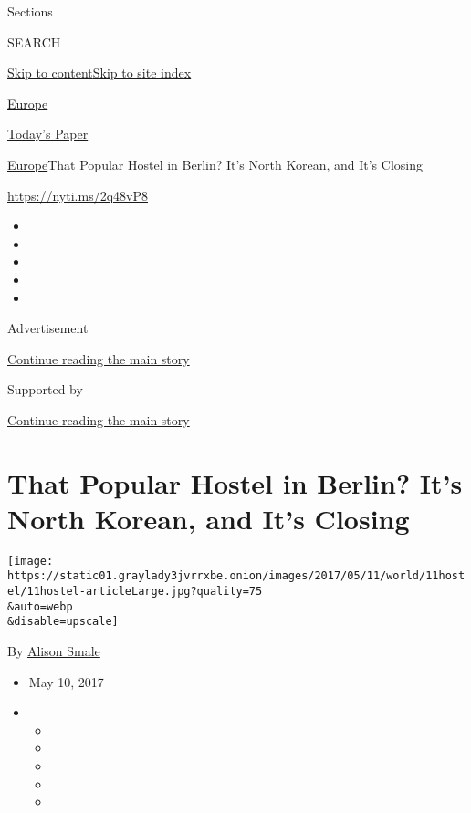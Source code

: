 Sections

SEARCH

\protect\hyperlink{site-content}{Skip to
content}\protect\hyperlink{site-index}{Skip to site index}

\href{https://www.nytimes3xbfgragh.onion/section/world/europe}{Europe}

\href{https://myaccount.nytimes3xbfgragh.onion/auth/login?response_type=cookie\&client_id=vi}{}

\href{https://www.nytimes3xbfgragh.onion/section/todayspaper}{Today's
Paper}

\href{/section/world/europe}{Europe}\textbar{}That Popular Hostel in
Berlin? It's North Korean, and It's Closing

\url{https://nyti.ms/2q48vP8}

\begin{itemize}
\item
\item
\item
\item
\item
\end{itemize}

Advertisement

\protect\hyperlink{after-top}{Continue reading the main story}

Supported by

\protect\hyperlink{after-sponsor}{Continue reading the main story}

\hypertarget{that-popular-hostel-in-berlin-its-north-korean-and-its-closing}{%
\section{That Popular Hostel in Berlin? It's North Korean, and It's
Closing}\label{that-popular-hostel-in-berlin-its-north-korean-and-its-closing}}

\texttt{[image: https://static01.graylady3jvrrxbe.onion/images/2017/05/11/world/11hostel/11hostel-articleLarge.jpg?quality=75\\\&auto=webp\\\&disable=upscale]}

By \href{http://www.nytimes3xbfgragh.onion/by/alison-smale}{Alison
Smale}

\begin{itemize}
\item
  May 10, 2017
\item
  \begin{itemize}
  \item
  \item
  \item
  \item
  \item
  \end{itemize}
\end{itemize}

